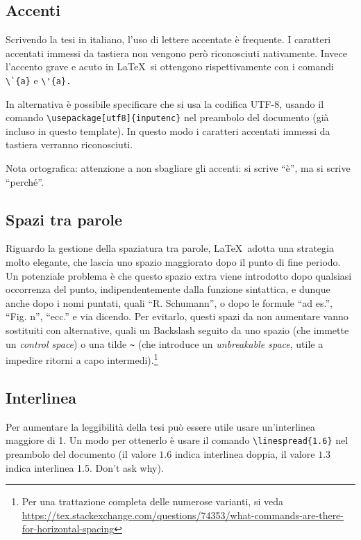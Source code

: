 \documentclass[12pt]{report}
\begin{document}
\subsection{Accenti}

Scrivendo la tesi in italiano, l'uso di lettere accentate \`e frequente. I caratteri accentati immessi da tastiera non vengono per\`o riconosciuti nativamente. Invece l'accento grave e acuto in \LaTeX\ si ottengono rispettivamente con i comandi \verb|\`{a}| e \verb|\'{a}.| 

In alternativa \`e possibile specificare che si usa la codifica UTF-8, usando il comando \verb|\usepackage[utf8]{inputenc}| nel preambolo del documento (già incluso in questo template). In questo modo i caratteri accentati immessi da tastiera verranno riconosciuti.

Nota ortografica: attenzione a non sbagliare gli accenti: si scrive ``\`e'', ma si scrive ``perch\'e''.

\subsection{Spazi tra parole}

Riguardo la gestione della spaziatura tra parole, \LaTeX\ adotta una strategia molto elegante, che lascia uno spazio maggiorato dopo il punto di fine periodo. Un potenziale problema è che questo spazio extra viene introdotto dopo qualsiasi occorrenza del punto, indipendentemente dalla funzione sintattica, e dunque anche dopo i nomi puntati, quali ``R. Schumann'', o dopo le formule ``ad es.'', ``Fig. n'', ``ecc.'' e via dicendo. Per evitarlo, questi spazi da non aumentare vanno sostituiti con alternative, quali un Backslash seguito da uno spazio (che immette un \textit{control space}) o una tilde \verb|~| (che introduce un \textit{unbreakable space}, utile a impedire ritorni a capo intermedi).\footnote{Per una trattazione completa delle numerose varianti, si veda \url{https://tex.stackexchange.com/questions/74353/what-commands-are-there-for-horizontal-spacing}}

\subsection{Interlinea}

Per aumentare la leggibilit\`a della tesi pu\`o essere utile usare un'interlinea maggiore di 1. Un modo per ottenerlo \`e usare il comando \verb|\linespread{1.6}| nel preambolo del documento (il valore $1.6$ indica interlinea doppia, il valore $1.3$ indica interlinea 1.5. Don't ask why).
\end{document}

